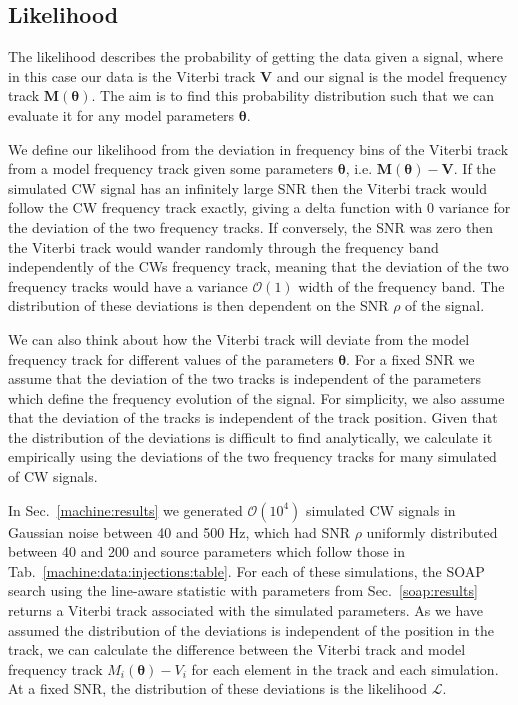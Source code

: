 %
%
\subsection{\label{par_est:bayes:likelihood}Likelihood}
%
%

The likelihood describes the probability of getting the data given a signal, where in this case our data is the Viterbi track $\bm{V}$ and our signal is the model frequency track $\bm{M}(\bm{\theta})$. 
The aim is to find this probability distribution such that we can evaluate it for any model parameters $\bm{\theta}$.

We define our likelihood from the deviation in frequency bins of the Viterbi track from a model frequency track given some parameters $\bm{\theta}$, i.e. $\bm{M}(\bm{\theta}) - \bm{V}$.
If the simulated \gls{CW} signal has an infinitely large \gls{SNR}
then the Viterbi track would follow the \gls{CW} frequency track exactly, giving a delta function with 0 variance for the deviation of the two frequency tracks. If conversely, the \gls{SNR} was zero then the Viterbi track would
wander randomly through the frequency band independently of the \glspl{CW} frequency track,
meaning that the deviation of the two frequency tracks would have a variance $\mathcal{O}(1)$ width of the frequency band.
The distribution of these deviations is then dependent on the \gls{SNR} $\rho$ of the signal.  

We can also think about how the Viterbi track will deviate from the model frequency track for different values of the parameters $\bm{\theta}$.
For a fixed \gls{SNR} we assume that the deviation of the two tracks is independent of the parameters which define the frequency evolution of the signal. 
For simplicity, we also assume that the deviation of the tracks is independent of the track position.
Given that the distribution of the deviations is difficult to find analytically, we calculate it empirically using the deviations of the two frequency tracks for many simulated of \gls{CW} signals. 

In Sec.~\ref{machine:results} we generated $\mathcal{O}(10^{4})$ simulated
\gls{CW} signals in Gaussian noise between 40 and 500 Hz, which had \gls{SNR}
$\rho$ uniformly distributed between 40 and 200 and
source parameters which follow those in
Tab.~\ref{machine:data:injections:table}. For each of these simulations, the
SOAP search using the line-aware statistic with parameters from
Sec.~\ref{soap:results} returns a Viterbi track associated with the simulated
parameters.  As we have assumed the distribution of the deviations is independent of the position in the track, we can calculate the difference between the Viterbi track and model frequency track $M_i(\bm{\theta}) - V_i$ for each
element in the track and each simulation.
At a fixed \gls{SNR}, the distribution of these deviations is the likelihood $\mathcal{L}$. 

